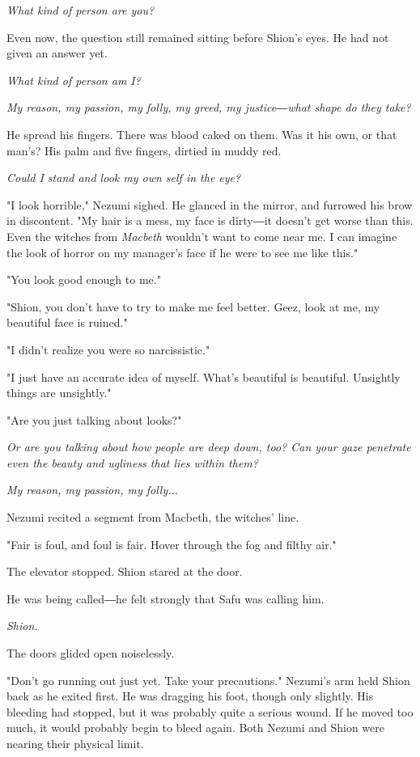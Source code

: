 \emph{What kind of person are you?}

Even now, the question still remained sitting before Shion's eyes. He
had not given an answer yet.

\emph{What kind of person am I?}

\emph{My reason, my passion, my folly, my greed, my justice―what shape do they
	take?}

He spread his fingers. There was blood caked on them. Was it his own, or
that man's? His palm and five fingers, dirtied in muddy red.

\emph{Could I stand and look my own self in the eye?}

"I look horrible," Nezumi sighed. He glanced in the mirror, and furrowed
his brow in discontent. "My hair is a mess, my face is dirty―it doesn't
get worse than this. Even the witches from \emph{Macbeth} wouldn't want to come
near me. I can imagine the look of horror on my manager's face if he
were to see me like this."

"You look good enough to me."

"Shion, you don't have to try to make me feel better. Geez, look at me,
my beautiful face is ruined."

"I didn't realize you were so narcissistic."

"I just have an accurate idea of myself. What's beautiful is beautiful.
Unsightly things are unsightly."

"Are you just talking about looks?"

\emph{Or are you talking about how people are deep down, too? Can your gaze
	penetrate even the beauty and ugliness that lies within them?}

\emph{My reason, my passion, my folly...}

Nezumi recited a segment from Macbeth, the witches' line.

"Fair is foul, and foul is fair. Hover through the fog and filthy air."

The elevator stopped. Shion stared at the door.

He was being called―he felt strongly that Safu was calling him.

\emph{Shion.}

The doors glided open noiselessly.

"Don't go running out just yet. Take your precautions." Nezumi's arm
held Shion back as he exited first. He was dragging his foot, though
only slightly. His bleeding had stopped, but it was probably quite a
serious wound. If he moved too much, it would probably begin to bleed
again. Both Nezumi and Shion were nearing their physical limit.

